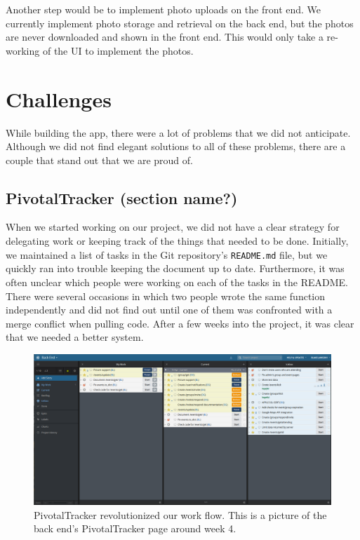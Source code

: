 \documentclass[12pt]{article}
\begin{document}
Another step would be to implement photo uploads on the front end.
We currently implement photo storage and retrieval on the back end, but the photos are never downloaded and shown in the front end.
This would only take a re-working of the UI to implement the photos.

\section{Challenges}

While building the app, there were a lot of problems that we did not anticipate.
Although we did not find elegant solutions to all of these problems,
there are a couple that stand out that we are proud of.

\subsection{PivotalTracker (section name?)}

When we started working on our project, we did not have a clear strategy for 
delegating work or keeping track of the things that needed to be done.
Initially, we maintained a list of tasks in the Git repository's \texttt{README.md} file,
but we quickly ran into trouble keeping the document up to date.
Furthermore, it was often unclear which people were working on each of the tasks in the README.
There were several occasions in which two people wrote the same function independently
and did not find out until one of them was confronted with a merge conflict when pulling code.
After a few weeks into the project, it was clear that we needed a better system.

\begin{figure}
    \centering
    \includegraphics[scale=0.3]{pivotaltracker.png}
    \caption{
        PivotalTracker revolutionized our work flow. 
        This is a picture of the back end's PivotalTracker page around week 4.
    }
    \label{fig:pivotaltracker}
\end{figure}
\end{document}
